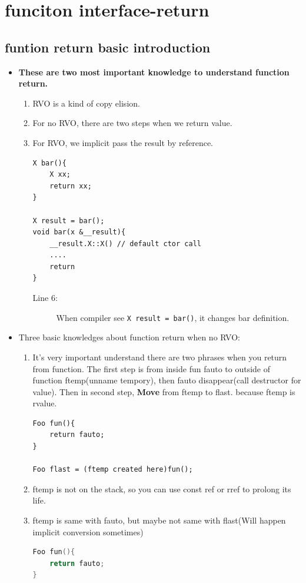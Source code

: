 \documentclass[a4paper,11pt,twoside]{book}
\begin{document}
\section{funciton interface-return}
\subsection{funtion return basic introduction}
\begin{itemize}
	\item \textbf{These are two most important knowledge to understand function return.}
	\begin{enumerate}
		\item RVO is a kind of copy elision.
		\item For no RVO, there are two steps when we return value.
		\item For RVO, we implicit pass the result by reference.
\begin{lstlisting}
X bar(){
	X xx;
	return xx;
}
	
X result = bar();
void bar(x &__result){
	__result.X::X() // default ctor call
	....
	return
}
\end{lstlisting}
\begin{description}
	\item[Line 6:] When compiler see \texttt{X result = bar()}, it changes bar definition.  
\end{description}

	\end{enumerate}
	
	\item Three basic knowledges about function return when no RVO:
	\begin{enumerate}
		\item It's very important understand there are two phrases when you return from function. The first step  is from inside fun fauto to outside of function ftemp(unname tempory), then fauto disappear(call destructor for value).  Then in second step, \textbf{Move} from ftemp to flast. because ftemp is rvalue.
\begin{lstlisting}[numbers=none]
Foo fun(){
	return fauto;
}
		
Foo flast = (ftemp created here)fun();
\end{lstlisting}
		\item ftemp is not on the stack, so you can use const ref or rref to prolong its life.
		
		\item ftemp is same with fauto, but maybe not same with flast(Will happen implicit conversion sometimes)
\begin{lstlisting}[frame=single, language=c++]
Foo fun(){
	return fauto;
}
		

\end{lstlisting}
\end{enumerate}
\end{itemize}
\end{document}

